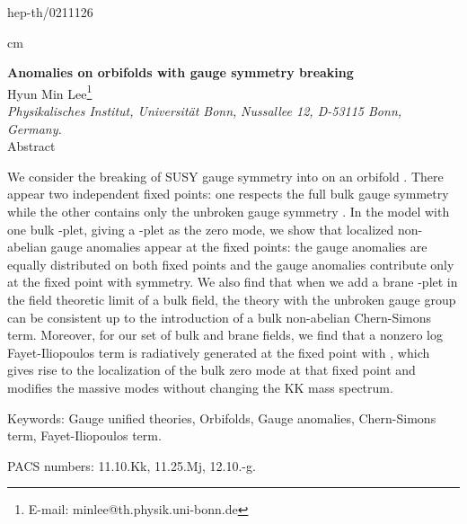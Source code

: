 \documentclass[a4paper,12pt]{article}
\begin{document}
%
%
\begin{flushright}
hep-th/0211126
\end{flushright}
 cm
\begin{center}
{\Large {\bf
Anomalies on orbifolds with gauge symmetry breaking
}
}
\\[0pt]

\vskip 1.5cm
Hyun Min Lee\footnote{E-mail: minlee@th.physik.uni-bonn.de}
\\[0pt]
\vspace{0.23cm}
{\it  Physikalisches Institut, Universit\"at Bonn,}
{\it Nussallee 12, D-53115 Bonn, Germany.}\\
\bigskip
\vspace{3.4cm} Abstract\\[2ex]
\end{center}
We consider the breaking of \coordHE{} SUSY \coordHE{} gauge symmetry
into \coordHE{} on an orbifold \coordHE{}. There appear two independent fixed points: one respects
the full bulk gauge symmetry \coordHE{} while the other contains only the
unbroken gauge symmetry \coordHE{}. In the model with one bulk \coordHE{}-plet,
giving a \coordHE{}-plet as the zero mode, we show that
localized non-abelian gauge anomalies appear at the fixed points: 
the \coordHE{} gauge anomalies are equally distributed on
both fixed points and the \coordHE{} gauge anomalies
contribute only at the fixed point with \coordHE{} symmetry. 
We also find that when we add a brane \coordHE{}-plet 
in the field theoretic limit of a bulk field, 
the theory with the unbroken
gauge group can be consistent up to the introduction of a bulk non-abelian 
Chern-Simons term. Moreover, for our set of bulk and brane fields, 
we find that  
a nonzero log Fayet-Iliopoulos term is radiatively generated 
at the fixed point with \coordHE{}, which gives rise to
the localization of the bulk zero mode at that fixed point and modifies 
the massive modes without changing the KK mass spectrum.

\vskip 1cm
\noindent Keywords: Gauge unified theories, Orbifolds, Gauge anomalies, 
Chern-Simons term, Fayet-Iliopoulos term.

\noindent PACS numbers: 11.10.Kk, 11.25.Mj, 12.10.-g.
\newpage
\end{document}
